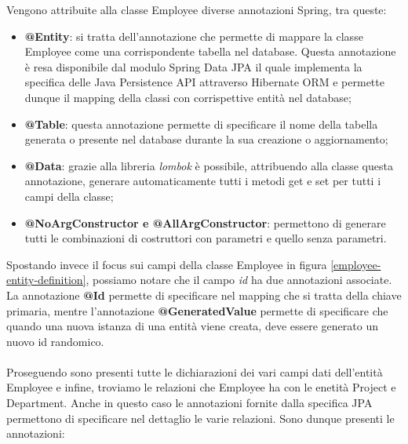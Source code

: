 \FloatBarrier
Vengono attribuite alla classe Employee diverse annotazioni Spring, tra queste:
\begin{itemize}
  \item \textbf{@Entity}: si tratta dell'annotazione che permette di mappare la classe Employee come una corrispondente tabella nel database. Questa annotazione è resa disponibile dal modulo Spring Data JPA il quale implementa la specifica delle Java Persistence API attraverso Hibernate ORM e permette dunque il mapping della classi con corrispettive entità nel database;
  \item \textbf{@Table}: questa annotazione permette di specificare il  nome della tabella generata o presente nel database durante la sua creazione o aggiornamento;
  \item \textbf{@Data}: grazie alla libreria \textit{lombok} è possibile, attribuendo alla classe questa annotazione, generare automaticamente tutti i metodi get e set per tutti i campi della classe;
  \item \textbf{@NoArgConstructor e @AllArgConstructor}: permettono di generare tutti le combinazioni di costruttori con parametri e quello senza parametri.
\end{itemize}
Spostando invece il focus sui campi della classe Employee in figura \ref{employee-entity-definition}, possiamo notare che il campo \textit{id} ha due annotazioni associate. La annotazione \textbf{@Id} permette di specificare nel mapping che si tratta della chiave primaria, mentre l'annotazione \textbf{@GeneratedValue} permette di specificare che quando una nuova istanza di una entità viene creata, deve essere generato un nuovo id randomico.\\\\
Proseguendo sono presenti tutte le dichiarazioni dei vari campi dati dell'entità Employee e infine, troviamo le relazioni che Employee ha con le enetità Project e Department. Anche in questo caso le annotazioni fornite dalla specifica JPA permettono di specificare nel dettaglio le varie relazioni. Sono dunque presenti le annotazioni:
